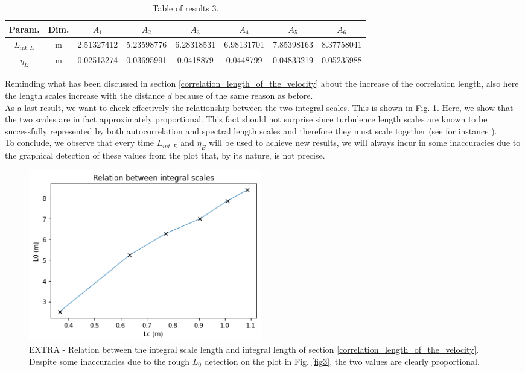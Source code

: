 \documentclass[11pt,titlepage]{article}
\begin{document}
\begin{table}[h]
\centering
\caption{Table of results 3.}\label{tab3}
    \begin{tabular}{ | c | c | c | c | c | c | c | c |}
    \hline
    Param. & Dim. & $A_1$ & $A_2$ & $A_3$ & $A_4$ & $A_5$ & $A_6$ \\
    \hline
    $L_{\mathrm{int},E}$ & m &2.51327412 &5.23598776& 6.28318531& 6.98131701& 7.85398163 &8.37758041 \\
    \hline
    $\eta_E$ & m& 0.02513274 &0.03695991 &0.0418879&  0.0448799&  0.04833219& 0.05235988  \\
    \hline
    \end{tabular}
\end{table}
Reminding what has been discussed in section \ref{correlation_length_of_the_velocity} about the increase of the correlation length, also here the length scales increase with the distance $d$ because of the same reason as before. \\
As a last result, we want to check effectively the relationship between the two integral scales. This is shown in Fig. \ref{fig4}. Here, we show that the two scales are in fact approximately proportional. This fact should not surprise since turbulence length scales are known to be successfully represented by both autocorrelation and spectral length scales and therefore they must scale together (see for instance \cite{trush_2020}).\\
To conclude, we observe that every time $L_{int,E}$ and $\eta_E$ will be used to achieve new results, we will always incur in some inaccuracies due to the graphical detection of these values from the plot that, by its nature, is not precise.
	\begin{center} 
	\begin{figure} [h]
		\centering
		\includegraphics[width = 4in]{./figures/ex1_3_plus.png}
		\caption{EXTRA - Relation between the integral scale length and integral length of section \ref{correlation_length_of_the_velocity}. Despite some inaccuracies due to the rough $L_0$ detection on the plot in Fig. \ref{fig3}, the two values are clearly proportional.}
		\label{fig4}
	\end{figure}
\end{center}
\end{document}
